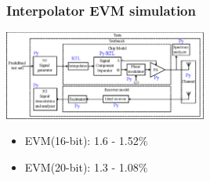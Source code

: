 \documentclass{sdkslides}
\begin{document}
\begin{frame}[t]
    \frametitle{Interpolator EVM simulation}
    \begin{center}
        \includegraphics[width=0.5\textwidth]{Pics/outphasing_model_interp.eps}
    \end{center}
    \begin{figure}
        \begin{center}
            \qquad
        \end{center}
     \end{figure}
     \begin{itemize}
         \item EVM(16-bit): 1.6 - 1.52\%
         \item EVM(20-bit): 1.3 - 1.08\%
     \end{itemize}
\end{frame}
\end{document}
